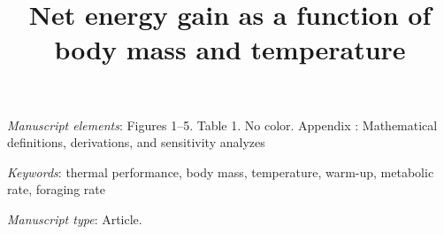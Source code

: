 \documentclass[11pt]{article}
\begin{document}



\title{Net energy gain as a function of body mass and temperature}


\date{}

\maketitle

\bigskip

\noindent
\textit{Manuscript elements}:
Figures 1--5.
Table 1.
No color.
Appendix :  Mathematical definitions,  derivations, and sensitivity analyzes

\bigskip

\noindent
\textit{Keywords}:
thermal performance, body mass, temperature, warm-up, metabolic rate, foraging rate

\bigskip

\noindent
\textit{Manuscript type}:
Article.

\vfill


\newpage


\linenumbers{}
\modulolinenumbers[2]



\newpage

\end{document}
